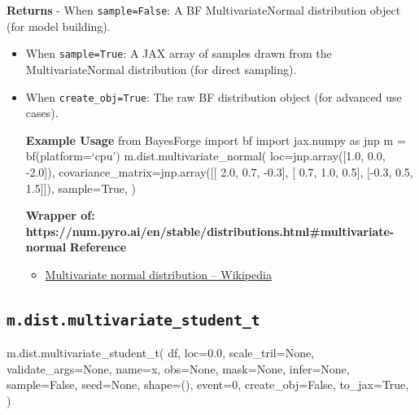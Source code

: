 \documentclass[
  letterpaper,
  DIV=11,
  numbers=noendperiod]{scrartcl}
\newenvironment{Shaded}{\begin{snugshade}}{\end{snugshade}}
\newcommand{\DecValTok}[1]{\textcolor[rgb]{0.68,0.00,0.00}{#1}}
\newcommand{\FloatTok}[1]{\textcolor[rgb]{0.68,0.00,0.00}{#1}}
\newcommand{\NormalTok}[1]{\textcolor[rgb]{0.00,0.23,0.31}{#1}}
\newcommand{\OperatorTok}[1]{\textcolor[rgb]{0.37,0.37,0.37}{#1}}
\newcommand{\StringTok}[1]{\textcolor[rgb]{0.13,0.47,0.30}{#1}}
\newcommand{\VariableTok}[1]{\textcolor[rgb]{0.07,0.07,0.07}{#1}}
\providecommand{\tightlist}{%
  \setlength{\itemsep}{0pt}\setlength{\parskip}{0pt}}\usepackage{longtable,booktabs,array}
\begin{document}
\textbf{Returns} - When \texttt{sample=False}: A BF MultivariateNormal
distribution object (for model building).

\begin{itemize}
\item
  When \texttt{sample=True}: A JAX array of samples drawn from the
  MultivariateNormal distribution (for direct sampling).
\item
  When \texttt{create\_obj=True}: The raw BF distribution object (for
  advanced use cases).

  \textbf{Example Usage} from BayesForge import bf import jax.numpy as
  jnp m = bf(platform=`cpu') m.dist.multivariate\_normal(
  loc=jnp.array({[}1.0, 0.0, -2.0{]}),
  covariance\_matrix=jnp.array({[}{[} 2.0, 0.7, -0.3{]}, {[} 0.7, 1.0,
  0.5{]}, {[}-0.3, 0.5, 1.5{]}{]}), sample=True, )

  \textbf{Wrapper of:
  https://num.pyro.ai/en/stable/distributions.html\#multivariate-normal}
  \textbf{Reference}

  \begin{itemize}
  \tightlist
  \item
    \href{https://en.wikipedia.org/wiki/Multivariate_normal_distribution}{Multivariate
    normal distribution -- Wikipedia}
  \end{itemize}
\end{itemize}

\subsection{\texorpdfstring{\texttt{m.dist.multivariate\_student\_t}}{m.dist.multivariate\_student\_t}}\label{multivariate_student_t}

\begin{Shaded}
\begin{Highlighting}[]
\NormalTok{m.dist.multivariate\_student\_t(}
\NormalTok{    df,}
\NormalTok{    loc}\OperatorTok{=}\FloatTok{0.0}\NormalTok{,}
\NormalTok{    scale\_tril}\OperatorTok{=}\VariableTok{None}\NormalTok{,}
\NormalTok{    validate\_args}\OperatorTok{=}\VariableTok{None}\NormalTok{,}
\NormalTok{    name}\OperatorTok{=}\StringTok{\textquotesingle{}x\textquotesingle{}}\NormalTok{,}
\NormalTok{    obs}\OperatorTok{=}\VariableTok{None}\NormalTok{,}
\NormalTok{    mask}\OperatorTok{=}\VariableTok{None}\NormalTok{,}
\NormalTok{    infer}\OperatorTok{=}\VariableTok{None}\NormalTok{,}
\NormalTok{    sample}\OperatorTok{=}\VariableTok{False}\NormalTok{,}
\NormalTok{    seed}\OperatorTok{=}\VariableTok{None}\NormalTok{,}
\NormalTok{    shape}\OperatorTok{=}\NormalTok{(),}
\NormalTok{    event}\OperatorTok{=}\DecValTok{0}\NormalTok{,}
\NormalTok{    create\_obj}\OperatorTok{=}\VariableTok{False}\NormalTok{,}
\NormalTok{    to\_jax}\OperatorTok{=}\VariableTok{True}\NormalTok{,}
\NormalTok{)}
\end{Highlighting}
\end{Shaded}
\end{document}

